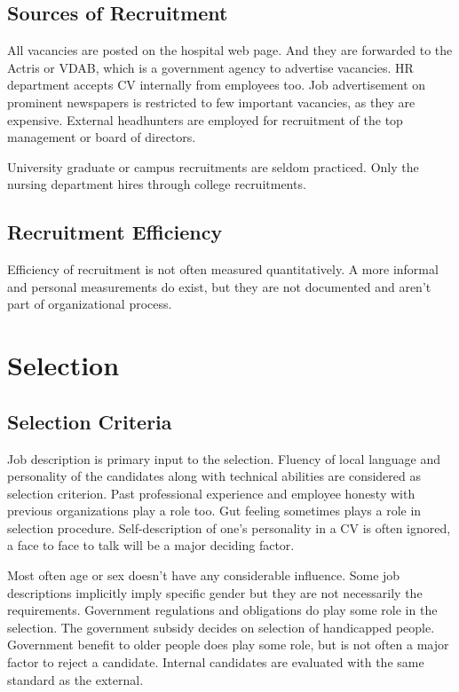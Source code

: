 \documentclass[a4paper,fleqn,11pt,dvips,titlepage]{article}
\numberwithin{figure}{section}
\numberwithin{equation}{section}
\begin{document}
\subsection{Sources of Recruitment}

All vacancies are posted on the hospital web page.
And they are forwarded to the Actris or VDAB, which is a government agency to advertise vacancies.
HR department accepts CV internally from employees too.
Job advertisement on prominent newspapers is restricted to few important vacancies, as they are expensive.
External headhunters are employed for recruitment of the top management or board of directors. 

University graduate or campus recruitments are seldom practiced.
Only the nursing department hires through college recruitments.


\subsection{Recruitment Efficiency}

Efficiency of recruitment is not often measured quantitatively.
A more informal and personal measurements do exist, but they are not documented and aren’t part of organizational process.

\section{Selection}
 
\subsection{Selection Criteria}

Job description is primary input to the selection.
Fluency of local language and personality of the candidates along with technical abilities are considered as selection criterion.
Past professional experience and employee honesty with previous organizations play a role too.
Gut feeling sometimes plays a role in selection procedure.
Self-description of one’s personality in a CV is often ignored, a face to face to talk will be a major deciding factor. 

Most often age or sex doesn’t have any considerable influence.
Some job descriptions implicitly imply specific gender but they are not necessarily the requirements.
Government regulations and obligations do play some role in the selection.
The government subsidy decides on selection of handicapped people.
Government benefit to older people does play some role, but is not often a major factor to reject a candidate.
Internal candidates are evaluated with the same standard as the external.
\end{document}
